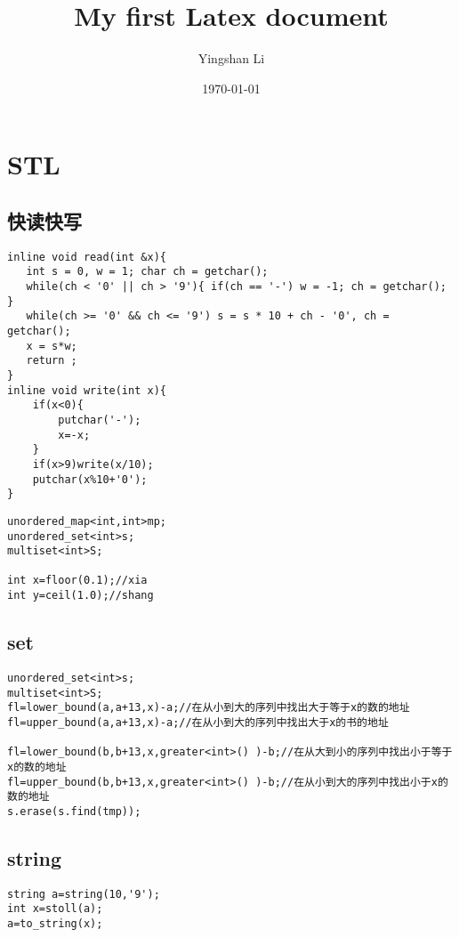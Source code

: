 \documentclass[12pt, a4paper, oneside]{ctexart}
\title{My first Latex document}
\author{Yingshan Li}
\date{\today}
\begin{document}
 

\maketitle
\thispagestyle{empty}

\newpage
\tableofcontents 
\thispagestyle{empty}


\newpage 
\section{STL} 
\subsection{快读快写} 
\lstset{language=C++}
\begin{lstlisting}
inline void read(int &x){
   int s = 0, w = 1; char ch = getchar();
   while(ch < '0' || ch > '9'){ if(ch == '-') w = -1; ch = getchar(); }
   while(ch >= '0' && ch <= '9') s = s * 10 + ch - '0', ch = getchar();
   x = s*w;
   return ;
}
inline void write(int x){
    if(x<0){
    	putchar('-');
		x=-x;
	}
    if(x>9)write(x/10);
    putchar(x%10+'0');
}  
\end{lstlisting}
\begin{lstlisting}
unordered_map<int,int>mp;
unordered_set<int>s;
multiset<int>S;

int x=floor(0.1);//xia
int y=ceil(1.0);//shang
\end{lstlisting}


\newpage
\subsection{set} 
\begin{lstlisting}
unordered_set<int>s;
multiset<int>S;
fl=lower_bound(a,a+13,x)-a;//在从小到大的序列中找出大于等于x的数的地址 
fl=upper_bound(a,a+13,x)-a;//在从小到大的序列中找出大于x的书的地址

fl=lower_bound(b,b+13,x,greater<int>() )-b;//在从大到小的序列中找出小于等于x的数的地址 
fl=upper_bound(b,b+13,x,greater<int>() )-b;//在从小到大的序列中找出小于x的数的地址 
s.erase(s.find(tmp));
\end{lstlisting}



\subsection{string} 
\begin{lstlisting}
string a=string(10,'9'); 
int x=stoll(a);
a=to_string(x);
\end{lstlisting}
\end{document}
